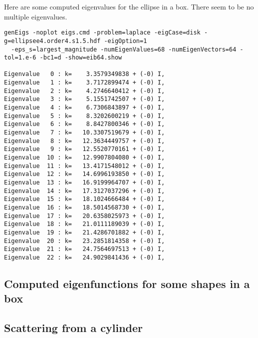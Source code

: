 Here are some computed eigenvalues for the ellipse in a box. There seem to be no multiple eigenvalues.
\begin{Verbatim}[fontsize=\footnotesize]
genEigs -noplot eigs.cmd -problem=laplace -eigCase=disk -g=ellipsee4.order4.s1.5.hdf -eigOption=1 
  -eps_s=largest_magnitude -numEigenValues=68 -numEigenVectors=64 -tol=1.e-6 -bc1=d -show=eib64.show

Eigenvalue   0 : k=    3.3579349838 + (-0) I,  
Eigenvalue   1 : k=    3.7172899474 + (-0) I,  
Eigenvalue   2 : k=    4.2746640412 + (-0) I,  
Eigenvalue   3 : k=    5.1551742507 + (-0) I,  
Eigenvalue   4 : k=    6.7306843897 + (-0) I,  
Eigenvalue   5 : k=    8.3202600219 + (-0) I,  
Eigenvalue   6 : k=    8.8427800346 + (-0) I,  
Eigenvalue   7 : k=   10.3307519679 + (-0) I,  
Eigenvalue   8 : k=   12.3634449757 + (-0) I,  
Eigenvalue   9 : k=   12.5520770161 + (-0) I,  
Eigenvalue  10 : k=   12.9907804080 + (-0) I,  
Eigenvalue  11 : k=   13.4171548012 + (-0) I,  
Eigenvalue  12 : k=   14.6996193850 + (-0) I,  
Eigenvalue  13 : k=   16.9199964707 + (-0) I,  
Eigenvalue  14 : k=   17.3127037296 + (-0) I,  
Eigenvalue  15 : k=   18.1024666484 + (-0) I,  
Eigenvalue  16 : k=   18.5014568730 + (-0) I,  
Eigenvalue  17 : k=   20.6358025973 + (-0) I,  
Eigenvalue  18 : k=   21.0111189039 + (-0) I,  
Eigenvalue  19 : k=   21.4286701882 + (-0) I,  
Eigenvalue  20 : k=   23.2851814358 + (-0) I,  
Eigenvalue  21 : k=   24.7564697513 + (-0) I,  
Eigenvalue  22 : k=   24.9029841436 + (-0) I,  

\end{Verbatim}







\clearpage
\subsection{Computed eigenfunctions for some shapes in a box}





\clearpage
\subsection{Scattering from a cylinder}

